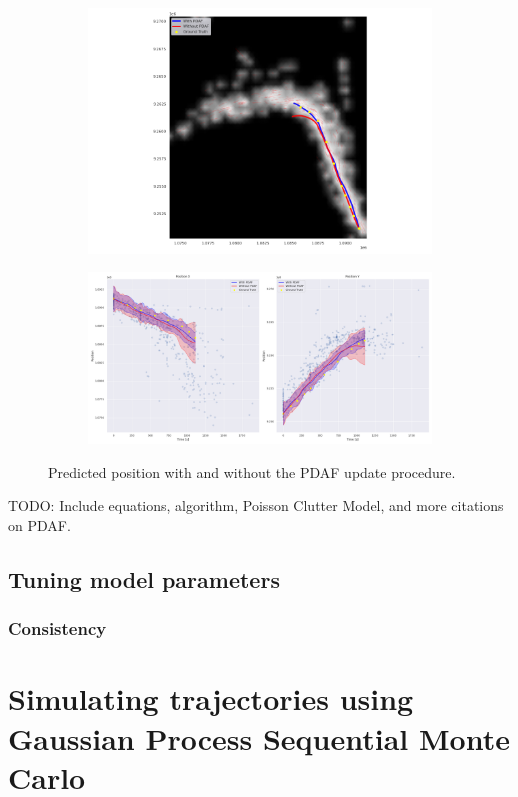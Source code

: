 \begin{figure}
    \begin{subfigure}{\textwidth}
    \includegraphics[width=\textwidth]{figures/dyngp/gp_ekf_with_pdaf.png}
    \end{subfigure}
    \begin{subfigure}{\textwidth}
    \includegraphics[width=\textwidth]{figures/dyngp/gp_ekf_unc_with_pdaf.png}
    \end{subfigure}
    \caption{Predicted position with and without the PDAF update procedure.}
\end{figure}

TODO: Include equations, algorithm, Poisson Clutter Model, and more citations on PDAF. 

\subsection{Tuning model parameters}
\subsubsection{Consistency}


\section{Simulating trajectories using Gaussian Process Sequential Monte Carlo}